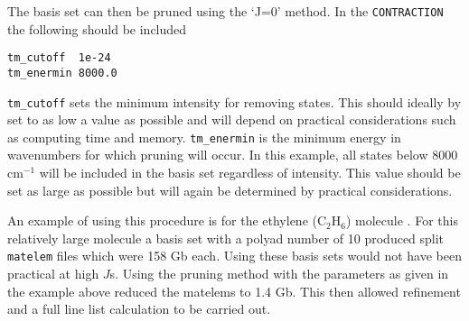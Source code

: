 The basis set can then be pruned using the `J=0' method. In the \verb|CONTRACTION| the following should be included
\begin{verbatim}
tm_cutoff  1e-24
tm_enermin 8000.0
\end{verbatim}
\verb|tm_cutoff| sets the minimum intensity for removing states. This should ideally by set to as low a value as possible and
will depend on practical considerations such as computing time and memory. \verb|tm_enermin| is the minimum energy in 
wavenumbers for which pruning will occur. In this example, all states below 8000 cm$^{-1}$ will be included in the 
basis set regardless of intensity. This value should be set as large as possible but will again be determined by practical
considerations.

An example of using this procedure is for the ethylene (C$_2$H$_6$) molecule \cite{jt729}. 
For this relatively large molecule a basis set
with a polyad number of 10 produced split \verb|matelem| files which were 158 Gb each. Using these basis sets would not
have been practical at high $J$s. Using the pruning method with the parameters as given in the example above reduced the 
matelems to 1.4 Gb. This then allowed refinement and a full line list calculation to be carried out.

